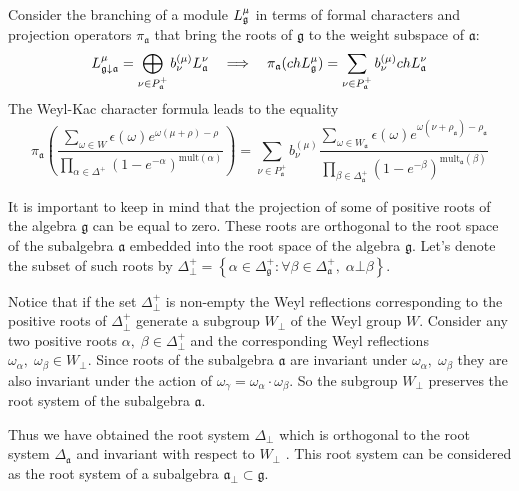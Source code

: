 \documentclass[a4paper,12pt]{article}
\theoremstyle{definition} \newtheorem{Def}{Definition}
\begin{document}
Consider the branching of a module $L_{\frak{g}}^{\mu }$ in terms of formal characters and
projection operators $\pi_{\mathfrak{a}}$ that bring the roots of $\mathfrak{g}$ to the
weight subspace of $\mathfrak{a}$:
\begin{equation}
  \label{eq:3}
  L_{\frak{g}\downarrow \frak{a}}^{\mu }=\bigoplus\limits_{\nu \in P_{\frak{a}%
    }^{+}}b_{\nu }^{\left( \mu \right) }L_{\frak{a}}^{\nu }\quad
  \Longrightarrow\quad
  \pi_{\mathfrak{a}}(ch L^{\mu}_{\mathfrak{g}})=
  \sum_{\nu\in P^{+}_{\mathfrak{a}}}b^{(\mu)}_{\nu} ch L^{\nu}_{\mathfrak{a}}
\end{equation}
The Weyl-Kac character formula leads to
the equality
\begin{equation}
  \label{eq:4}
  \pi_{\mathfrak{a}}\left(\frac{\sum_{\omega\in W} \epsilon(\omega) e^{\omega(\mu+\rho)-\rho}}
  {\prod_{\alpha\in\Delta^{+}}(1-e^{-\alpha})^{\mathrm{mult}(\alpha)}}\right) =
  \sum_{\nu\in P^{+}_{\mathfrak{a}}}b^{(\mu)}_{\nu}
  \frac{\sum_{\omega\in W_{\mathfrak{a}}}\epsilon(\omega)
  e^{\omega(\nu+\rho_{\mathfrak{a}})-\rho_{\mathfrak{a}}}}
  {\prod_{\beta\in \Delta_{\mathfrak{a}}^{+}}(1-e^{-\beta})^{\mathrm{mult}_{\mathfrak{a}}(\beta)}}
\end{equation}

It is important to keep in mind that the projection of some of positive roots of
the algebra $\mathfrak{g}$ can be equal to zero. These roots are orthogonal to the
root space of the subalgebra $\mathfrak{a}$ embedded into the root space of the
algebra $\mathfrak{g}$. Let's denote the subset of such roots by $\Delta^{+}_{\bot}
=\left\{\alpha\in\Delta_{\mathfrak{g}}^{+}:
\forall \beta\in \Delta_{\mathfrak{a}}^{+},\; \alpha\bot\beta \right\}$.

Notice that if the set $\Delta^{+}_{\bot}$ is non-empty the Weyl reflections
corresponding to the positive roots of $\Delta^{+}_{\bot}$ generate a subgroup
$W_{\bot}$ of the Weyl group $W$. Consider any two positive roots $\alpha,\;
\beta\in \Delta^{+}_{\bot}$ and the corresponding Weyl reflections
$\omega_{\alpha},\; \omega_{\beta}\in W_{\bot}$.  Since roots of the subalgebra
$\mathfrak{a}$ are invariant under $\omega_{\alpha}, \; \omega_{\beta}$ they
are also invariant under the action of $\omega_{\gamma}=\omega_{\alpha}\cdot \omega_{\beta}$.
So the subgroup $W_{\bot}$ preserves the root system of the subalgebra $\mathfrak{a}$.

Thus we have obtained the root system $\Delta_{\bot}$ which is orthogonal to the root
system $\Delta_{\mathfrak{a}}$ and invariant with respect to  $W_{\bot}$ . This root system
can be considered as the root system of a subalgebra $\mathfrak{a}_{\bot}\subset \mathfrak{g}$.
\end{document}
